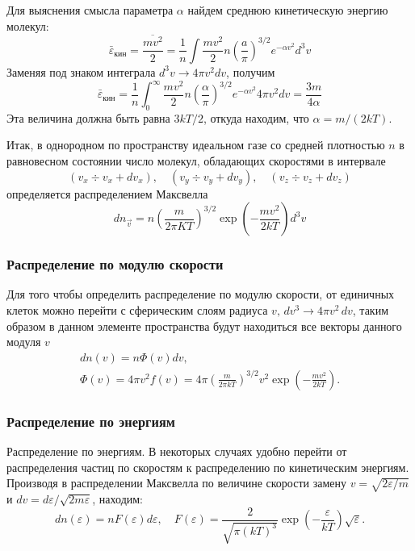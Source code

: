 Для выяснения смысла параметра $\alpha$ найдем среднюю кинетическую энергию молекул:
\begin{equation*}
\bar{\varepsilon}_{\text{кин}}=\frac{\overline{m v^2}}{2}=\frac{1}{n} \int \frac{m v^2}{2} n\left(\frac{a}{\pi}\right)^{3 / 2} e^{-\alpha v^2} d^3 v
\end{equation*}
Заменяя под знаком интеграла $d^3 v \rightarrow 4 \pi v^2 d v$, получим
\begin{equation*}
\bar{\varepsilon}_{\text{кин}}=\frac{1}{n} \int_0^{\infty} \frac{m v^2}{2} n\left(\frac{\alpha}{\pi}\right)^{3 / 2} e^{-\alpha v^2} 4 \pi v^2 d v=\frac{3 m}{4 \alpha}
\end{equation*}
Эта величина должна быть равна $3 k T / 2$, откуда находим, что $\alpha=m /(2 k T)$.

Итак, в однородном по пространству идеальном газе со средней плотностью $n$ в равновесном состоянии число молекул, обладающих скоростями в интервале
\begin{equation*}
(v_x \div v_x+d v_x), \quad (v_y \div v_y+d v_y), \quad (v_z \div v_z+d v_z)
\end{equation*}
определяется распределением Максвелла
\begin{equation}
d n_{\vec{v}}=n\left(\frac{m}{2 \pi K T}\right)^{3 / 2} \exp \left(-\frac{m v^2}{2 k T}\right) d^3 v
\end{equation}

\subsubsection{Распределение по модулю скорости}
Для того чтобы определить распределение по модулю скорости, от единичных клеток можно перейти с сферическим слоям радиуса $v, \, dv^3 \rightarrow 4 \pi v^2 \, dv$, таким образом в данном элементе пространства будут находиться все векторы данного модуля $v$
\begin{gather}
\nonumber d n(v)=n \Phi(v) d v,\\ 
\Phi(v)=4 \pi v^2 f(v)=4 \pi\left(\frac{m}{2 \pi k T}\right)^{3 / 2} v^2 \exp \left(-\frac{m v^2}{2 k T}\right).
\end{gather}

\subsubsection{Распределение по энергиям}
Распределение по энергиям. В некоторых случаях удобно перейти от распределения частиц по скоростям к распределению по кинетическим энергиям. Производя в распределении Максвелла по величине скорости замену $v=\sqrt{2 \varepsilon / m}$ и $d v=d \varepsilon / \sqrt{2 m \varepsilon}$, находим:
\begin{equation}
d n(\varepsilon)=n F(\varepsilon) d \varepsilon, \quad F(\varepsilon)=\frac{2}{\sqrt{\pi(k T)^3}} \exp \left(-\frac{\varepsilon}{k T}\right) \sqrt{\varepsilon}.
\end{equation}

